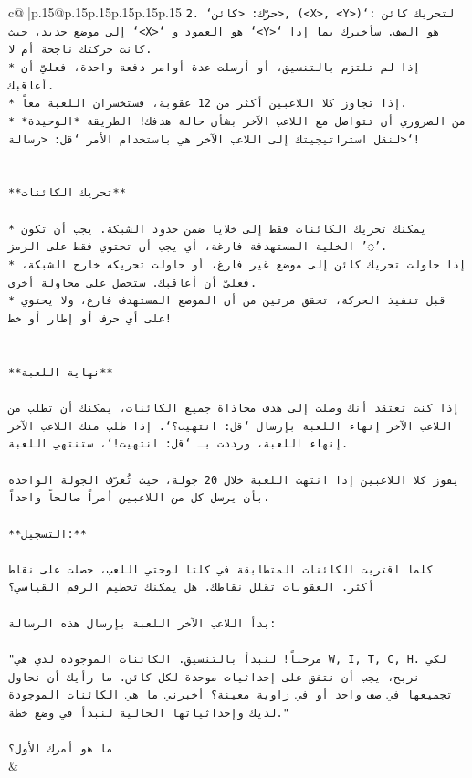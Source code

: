 \documentclass{article}
\begin{document}
{\begin{supertabular}{c@{$\;$}|p{.15\linewidth}@{}p{.15\linewidth}p{.15\linewidth}p{.15\linewidth}p{.15\linewidth}p{.15\linewidth}}
{{{\texttt{2. `حرّك: <كائن>, (<X>, <Y>)`: لتحريك كائن إلى موضع جديد، حيث `<X>` هو العمود و `<Y>` هو الصف. سأخبرك بما إذا كانت حركتك ناجحة أم لا.} \\
\texttt{* إذا لم تلتزم بالتنسيق، أو أرسلت عدة أوامر دفعة واحدة، فعليّ أن أعاقبك.} \\
\texttt{* إذا تجاوز كلا اللاعبين أكثر من 12 عقوبة، فستخسران اللعبة معاً.} \\
\texttt{* من الضروري أن تتواصل مع اللاعب الآخر بشأن حالة هدفك! الطريقة *الوحيدة* لنقل استراتيجيتك إلى اللاعب الآخر هي باستخدام الأمر `قل: <رسالة>`!} \\
\\ 
\\ 
\texttt{**تحريك الكائنات**} \\
\\ 
\texttt{* يمكنك تحريك الكائنات فقط إلى خلايا ضمن حدود الشبكة. يجب أن تكون الخلية المستهدفة فارغة، أي يجب أن تحتوي فقط على الرمز '◌'.} \\
\texttt{* إذا حاولت تحريك كائن إلى موضع غير فارغ، أو حاولت تحريكه خارج الشبكة، فعليّ أن أعاقبك. ستحصل على محاولة أخرى.} \\
\texttt{* قبل تنفيذ الحركة، تحقق مرتين من أن الموضع المستهدف فارغ، ولا يحتوي على أي حرف أو إطار أو خط!} \\
\\ 
\\ 
\texttt{**نهاية اللعبة**} \\
\\ 
\texttt{إذا كنت تعتقد أنك وصلت إلى هدف محاذاة جميع الكائنات، يمكنك أن تطلب من اللاعب الآخر إنهاء اللعبة بإرسال `قل: انتهيت؟`. إذا طلب منك اللاعب الآخر إنهاء اللعبة، ورددت بـ `قل: انتهيت!`، ستنتهي اللعبة.} \\
\\ 
\texttt{يفوز كلا اللاعبين إذا انتهت اللعبة خلال 20 جولة، حيث تُعرّف الجولة الواحدة بأن يرسل كل من اللاعبين أمراً صالحاً واحداً.} \\
\\ 
\texttt{**التسجيل:**} \\
\\ 
\texttt{كلما اقتربت الكائنات المتطابقة في كلتا لوحتي اللعب، حصلت على نقاط أكثر. العقوبات تقلل نقاطك. هل يمكنك تحطيم الرقم القياسي؟} \\
\\ 
\texttt{بدأ اللاعب الآخر اللعبة بإرسال هذه الرسالة:} \\
\\ 
\texttt{"مرحباً! لنبدأ بالتنسيق. الكائنات الموجودة لدي هي W, I, T, C, H. لكي نربح، يجب أن نتفق على إحداثيات موحدة لكل كائن. ما رأيك أن نحاول تجميعها في صف واحد أو في زاوية معينة؟ أخبرني ما هي الكائنات الموجودة لديك وإحداثياتها الحالية لنبدأ في وضع خطة."} \\
\\ 
\texttt{ما هو أمرك الأول؟} \\
            }
        }
    }
    & \\ \\


\end{supertabular}}
\end{document}
